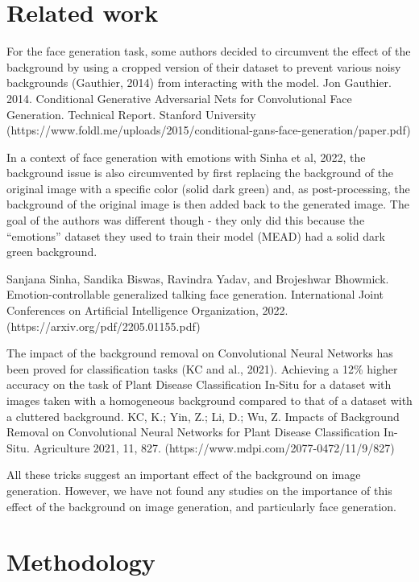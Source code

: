 \documentclass{article}
\begin{document}
\section{Related work}

\quad For the face generation task, some authors decided to circumvent the effect of the background by using a cropped version of their dataset to prevent various noisy backgrounds (Gauthier, 2014) from interacting with the model. 
Jon Gauthier. 2014. Conditional Generative Adversarial Nets for Convolutional Face Generation. Technical Report. Stanford University (https://www.foldl.me/uploads/2015/conditional-gans-face-generation/paper.pdf)

In a context of face generation with emotions with Sinha et al, 2022, the background issue is also circumvented by first replacing the background of the original image with a specific color  (solid dark green) and, as post-processing, the background of the original image is then added back to the generated image. 
The goal of the authors was different though - they only did this because the “emotions” dataset they used to train their model (MEAD) had a solid dark green background.

Sanjana Sinha, Sandika Biswas, Ravindra Yadav, and Brojeshwar Bhowmick. Emotion-controllable generalized talking face generation. International Joint Conferences on Artificial Intelligence Organization, 2022. (https://arxiv.org/pdf/2205.01155.pdf)

The impact of the background removal on Convolutional Neural Networks has been proved for classification tasks (KC and al., 2021). Achieving a 12\% higher accuracy on the task of Plant Disease Classification In-Situ for a dataset with images taken with a homogeneous background compared to that of a dataset with a cluttered background.
KC, K.; Yin, Z.; Li, D.; Wu, Z. Impacts of Background Removal on Convolutional Neural Networks for Plant Disease Classification In-Situ. Agriculture 2021, 11, 827. (https://www.mdpi.com/2077-0472/11/9/827)

All these tricks suggest an important effect of the background on image generation. 
However, we have not found any studies on the importance of this effect of the background on image generation, and particularly face generation.

\section{Methodology}
\end{document}

